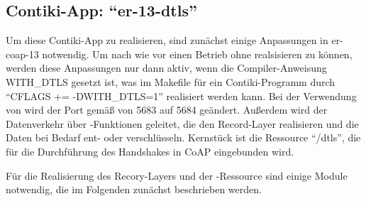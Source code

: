 \subsection{Contiki-App: "`er-13-dtls"'}

Um diese Contiki-App zu realisieren, sind zunächst einige Anpassungen in er-coap-13 notwendig. Um nach wie vor einen Betrieb ohne  realsisieren zu können,
werden diese Anpassungen nur dann aktiv, wenn die Compiler-Anweisung WITH\_DTLS gesetzt ist, was im Makefile für ein Contiki-Programm durch "`CFLAGS += -DWITH\_DTLS=1"'
realisiert werden kann. Bei der Verwendung von  wird der Port gemäß \cite[Seite 93]{portnumbers} von 5683 auf 5684 geändert. Außerdem wird der Datenverkehr
über -Funktionen geleitet, die den Record-Layer realisieren und die Daten bei Bedarf ent- oder verschlüsseln. Kernstück ist die Ressource "`/dtls"', die für
die Durchführung des Handshakes in CoAP eingebunden wird.

Für die Realisierung des Recory-Layers und der -Ressource sind einige Module notwendig, die im Folgenden zunächst beschrieben werden.

